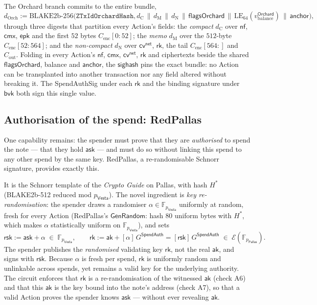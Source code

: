 \documentclass[11pt,a4paper]{article}
\theoremstyle{definition}
\newcommand{\F}{\mathbb{F}}
\newcommand{\nfsym}{\mathsf{nf}}
\newcommand{\cmx}{\mathsf{cmx}}
\newcommand{\cvsym}{\mathsf{cv}}
\newcommand{\rk}{\mathsf{rk}}
\newcommand{\Pallas}{\ensuremath{\mathsf{Pallas}}}
\newcommand{\Vesta}{\ensuremath{\mathsf{Vesta}}}
\newcommand{\Ep}{\ensuremath{\mathcal{E}}}
\newcommand{\ask}{\ensuremath{\mathsf{ask}}}
\newcommand{\aksym}{\ensuremath{\mathsf{ak}}}
\newcommand{\rsk}{\ensuremath{\mathsf{rsk}}}
\begin{document}
The Orchard branch commits to the entire bundle,
\[
d_{\mathrm{Orch}} := \mathrm{BLAKE2b\text{-}256}\bigl(\texttt{ZTxIdOrchardHash}, d_{\mathrm{C}} \,\|\, d_{\mathrm{M}} \,\|\, d_{\mathrm{N}} \,\|\, \mathsf{flagsOrchard} \,\|\, \mathrm{LE}_{64}(v_{\mathrm{balance}}^{\mathsf{Orchard}}) \,\|\, \mathsf{anchor}\bigr),
\]
through three digests that partition every Action's fields: the \emph{compact}
$d_{\mathrm{C}}$ over $\nfsym$, $\cmx$, $\mathsf{epk}$ and the first $52$ bytes
$C_{\mathrm{enc}}[0{:}52]$; the \emph{memo} $d_{\mathrm{M}}$ over the $512$-byte
$C_{\mathrm{enc}}[52{:}564]$; and the \emph{non-compact} $d_{\mathrm{N}}$ over
$\cvsym^{\mathsf{net}}$, $\rk$, the tail $C_{\mathrm{enc}}[564{:}]$ and
$C_{\mathrm{out}}$. Folding in every Action's $\nfsym$, $\cmx$,
$\cvsym^{\mathsf{net}}$, $\rk$ and ciphertexts beside the shared
$\mathsf{flagsOrchard}$, balance and $\mathsf{anchor}$, the $\mathsf{sighash}$
pins the exact bundle: no Action can be transplanted into another transaction
nor any field altered without breaking it. The SpendAuthSig under each $\rk$
and the binding signature under $\mathsf{bvk}$ both sign this single value.

\subsection{Authorisation of the spend: RedPallas}\label{sec:redpallas}

One capability remains: the spender must prove that they are \emph{authorised}
to spend the note --- that they hold $\ask$ --- and must do so without
linking this spend to any other spend by the same key. RedPallas, a
re-randomisable Schnorr signature, provides exactly this.

It is the Schnorr template of the \emph{Crypto Guide} on Pallas, with hash
$H^*$ (BLAKE2b-512 reduced mod $p_{\Vesta}$). The novel ingredient is
\emph{key re-randomisation}: the spender draws a randomiser
$\alpha \in \F_{p_{\Vesta}}$ uniformly at random, fresh for every Action
(RedPallas's $\mathsf{GenRandom}$: hash $80$ uniform bytes with $H^*$, which
makes $\alpha$ statistically uniform on $\F_{p_{\Vesta}}$), and sets
\[
\rsk := \ask + \alpha \;\in\; \F_{p_{\Vesta}}, \qquad \rk := \aksym + [\alpha]\,G^{\mathsf{SpendAuth}} = [\rsk]\,G^{\mathsf{SpendAuth}} \;\in\; \Ep(\F_{p_{\Pallas}}).
\]
The spender publishes the \emph{randomised} validating key $\rk$, not the
real $\aksym$, and signs with $\rsk$. Because $\alpha$ is fresh per spend,
$\rk$ is uniformly random and unlinkable across spends, yet remains a valid
key for the underlying authority. The circuit enforces that
$\rk$ is a re-randomisation of the witnessed $\aksym$ (check A6) and that
this $\aksym$ is the key bound into the note's address (check A7),
so that a valid Action proves the spender knows $\ask$ --- without ever
revealing $\aksym$.
\end{document}
